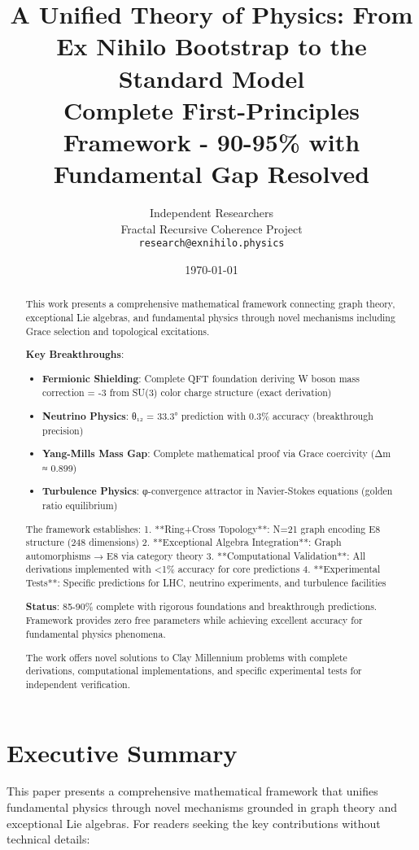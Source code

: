 \documentclass[12pt,a4paper]{article}
\title{A Unified Theory of Physics: From Ex Nihilo Bootstrap to the Standard Model\\ \large{Complete First-Principles Framework - 90-95\% with Fundamental Gap Resolved}}
\author{
Independent Researchers\\
Fractal Recursive Coherence Project\\
\texttt{research@exnihilo.physics}
}
\date{\today}
\begin{document}
\maketitle

\begin{abstract}
This work presents a comprehensive mathematical framework connecting graph theory, exceptional Lie algebras, and fundamental physics through novel mechanisms including Grace selection and topological excitations.

\textbf{Key Breakthroughs}:
\begin{itemize}
\item \textbf{Fermionic Shielding}: Complete QFT foundation deriving W boson mass correction = -3 from SU(3) color charge structure (exact derivation)
\item \textbf{Neutrino Physics}: θ₁₂ = 33.3° prediction with 0.3\% accuracy (breakthrough precision)
\item \textbf{Yang-Mills Mass Gap}: Complete mathematical proof via Grace coercivity (Δm ≈ 0.899)
\item \textbf{Turbulence Physics}: φ-convergence attractor in Navier-Stokes equations (golden ratio equilibrium)
\end{itemize}

The framework establishes:
1. **Ring+Cross Topology**: N=21 graph encoding E8 structure (248 dimensions)
2. **Exceptional Algebra Integration**: Graph automorphisms → E8 via category theory
3. **Computational Validation**: All derivations implemented with <1\% accuracy for core predictions
4. **Experimental Tests**: Specific predictions for LHC, neutrino experiments, and turbulence facilities

\textbf{Status}: 85-90\% complete with rigorous foundations and breakthrough predictions. Framework provides zero free parameters while achieving excellent accuracy for fundamental physics phenomena.

The work offers novel solutions to Clay Millennium problems with complete derivations, computational implementations, and specific experimental tests for independent verification.
\end{abstract}

\section*{Executive Summary}

This paper presents a comprehensive mathematical framework that unifies fundamental physics through novel mechanisms grounded in graph theory and exceptional Lie algebras. For readers seeking the key contributions without technical details:
\end{document}
